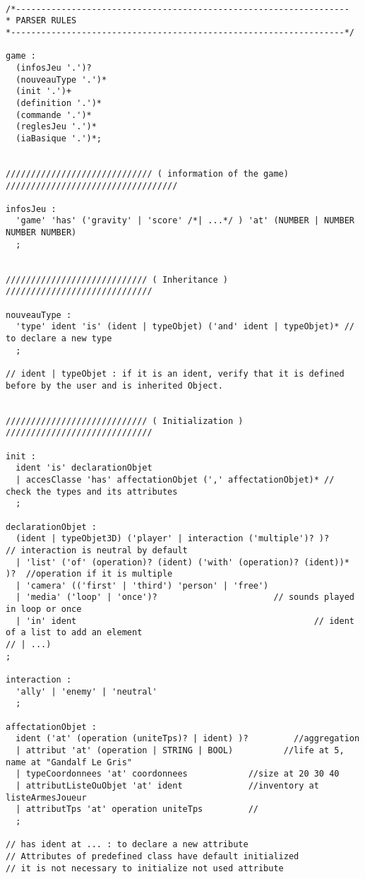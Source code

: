 \begin{lstlisting}[language=Grammar]

/*------------------------------------------------------------------
* PARSER RULES
*------------------------------------------------------------------*/
 
game :
  (infosJeu '.')?
  (nouveauType '.')*
  (init '.')+
  (definition '.')*
  (commande '.')*
  (reglesJeu '.')*
  (iaBasique '.')*;
 

///////////////////////////// ( information of the game)  //////////////////////////////////

infosJeu :
  'game' 'has' ('gravity' | 'score' /*| ...*/ ) 'at' (NUMBER | NUMBER NUMBER NUMBER)
  ;

 
//////////////////////////// ( Inheritance )  /////////////////////////////
 
nouveauType :
  'type' ident 'is' (ident | typeObjet) ('and' ident | typeObjet)* // to declare a new type
  ;            
  
// ident | typeObjet : if it is an ident, verify that it is defined before by the user and is inherited Object.

 
//////////////////////////// ( Initialization )  /////////////////////////////

init :
  ident 'is' declarationObjet
  | accesClasse 'has' affectationObjet (',' affectationObjet)* // check the types and its attributes
  ;
 
declarationObjet :
  (ident | typeObjet3D) ('player' | interaction ('multiple')? )?         // interaction is neutral by default
  | 'list' ('of' (operation)? (ident) ('with' (operation)? (ident))* )?  //operation if it is multiple 
  | 'camera' (('first' | 'third') 'person' | 'free')
  | 'media' ('loop' | 'once')? 						 // sounds played in loop or once
  | 'in' ident 				                                 // ident of a list to add an element
// | ...)
;           
 
interaction :
  'ally' | 'enemy' | 'neutral'
  ;
 
affectationObjet :
  ident ('at' (operation (uniteTps)? | ident) )?         //aggregation
  | attribut 'at' (operation | STRING | BOOL)          //life at 5, name at "Gandalf Le Gris"
  | typeCoordonnees 'at' coordonnees            //size at 20 30 40
  | attributListeOuObjet 'at' ident             //inventory at listeArmesJoueur
  | attributTps 'at' operation uniteTps         //
  ;
 
// has ident at ... : to declare a new attribute
// Attributes of predefined class have default initialized
// it is not necessary to initialize not used attribute
  

\end{lstlisting}
